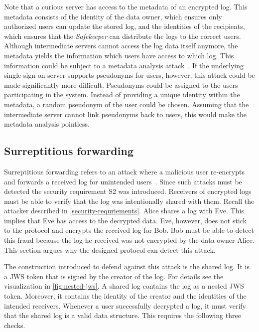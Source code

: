 \documentclass[../main.tex]{subfiles}
\begin{document}
Note that a curious server has access to the metadata of an encrypted log.
This metadata consists of the identity of the data owner, which ensures only authorized users can update the stored log, and the identities of the recipients, which ensures that the \emph{Safekeeper} can distribute the logs to the correct users.
Although intermediate servers cannot access the log data itself anymore, the metadata yields the information which users have access to which log.
This information could be subject to a metadata analysis attack~\cite{Greschbach2012,Mayer2016}.
If the underlying single-sign-on server supports pseudonyms for users, however, this attack could be made significantly more difficult.
Pseudonyms could be assigned to the users participating in the system.
Instead of providing a unique identity within the metadata, a random pseudonym of the user could be chosen.
Assuming that the intermediate server cannot link pseudonyms back to users, this would make the metadata analysis pointless.

\subsection{Surreptitious forwarding}
Surreptitious forwarding refers to an attack where a malicious user re-encrypts and forwards a received log for unintended users~\cite{Davis2001}.
Since such attacks must be detected the security requirement S2 was introduced.
Receivers of encrypted logs must be able to verify that the log was intentionally shared with them.
Recall the attacker described in \cref{security-requriements}.
Alice shares a log with Eve.
This implies that Eve has access to the decrypted data.
Eve, however, does not stick to the protocol and encrypts the received log for Bob.
Bob must be able to detect this fraud because the log he received was not encrypted by the data owner Alice.
This section argues why the designed protocol can detect this attack.

The construction introduced to defend against this attack is the shared log.
It is a JWS token that is signed by the creator of the log.
For details see the visualization in \cref{fig:nested-jws}.
A shared log contains the log as a nested JWS token.
Moreover, it contains the identity of the creator and the identities of the intended receivers.
Whenever a user successfully decrypted a log, it must verify that the shared log is a valid data structure.
This requires the following three checks.
\end{document}

